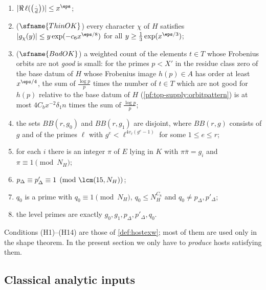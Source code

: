 \begin{definition}
\begin{enumerate}[label=(H\arabic*),leftmargin=*]
$\chi_8\topsupplyJ{-d}{\cdot}\topsupplyJ{-q}{\cdot}$ are zero-free in the box of height $8e^{z}e^{z'}$ and of conductor at
most this height ($\sfname{Boxq}$), and every real character $\chi$ of $H$ of conductor $N$ satisfies: if $d\mid N$
it is primitive, real, of conductor $\le8\,\topsupplyodd(Q_S)e^ze^{z'}$ and zero-free in the box of that height,
and if $q\mid N$, $d\nmid N$ the same with $8\,\topsupplyodd(Q_S)e^z$ ($\sfname{BoxH}$); here $\topsupplyodd(Q_S)$ is
the odd part of $Q_S$;
\item $|\Re\,\ell(\topsupplyJ{\cdot}{d})|\le x^\eps$;
\item ($\sfname{ThinOK}$) every character $\chi$ of $H$ satisfies $|g_\chi(y)|\le y\exp(-c_6x^{\eps/8})$ for all
$y\ge\frac13\exp(x^{\eps/3})$;
\item ($\sfname{BadOK}$) a weighted count of the elements $t\in T$ whose Frobenius orbits are not \emph{good} is
small: for the primes $p<X'$ in the residue class zero of the base datum of $H$ whose Frobenius image $h(p)\in A$
has order at least $x^{\eps/4}$, the sum of $\frac{\log p}p$ times the number of $t\in T$ which are not good for $h(p)$
relative to the base datum of $H$ (\cref{pf:top-supply:orbitpattern}) is at most $4C_bx^{-2}\delta_1n$ times the sum of
$\frac{\log p}p$;
\item the sets $BB(r,g_0)$ and $BB(r,g_1)$ are disjoint, where $BB(r,g)$ consists of $g$ and of the primes $\ell$
with $g^{e}<\ell^{4v_\ell(g^{e}-1)}$ for some $1\le e\le r$;
\item for each $i$ there is an integer $\pi$ of $E$ lying in $K$ with $\pi\bar\pi=g_i$ and $\pi\equiv1\pmod{N_H}$;
\item $p_\Delta\equiv p'_\Delta\equiv1\pmod{\lcm(15,N_H)}$;
\item $q_0$ is a prime with $q_0\equiv1\pmod{N_H}$, $q_0\le N_H^{C_8}$ and $q_0\ne p_\Delta,p'_\Delta$;
\item the level primes are exactly $g_0,g_1,p_\Delta,p'_\Delta,q_0$.
\end{enumerate}
 
\end{definition}

Conditions (H1)--(H14) are those of \cref{def:hostexw}; most of them are used only in the shape theorem. In the
present section we only have to \emph{produce} hosts satisfying them.

\subsection{Classical analytic inputs}\label{sec:pf:top-supply:classical}

